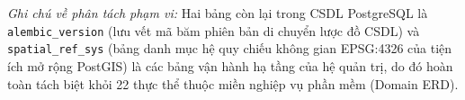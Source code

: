 \noindent\textit{Ghi chú về phân tách phạm vi:} Hai bảng còn lại trong CSDL PostgreSQL là \texttt{alembic\_version} (lưu vết mã băm phiên bản di chuyển lược đồ CSDL) và \texttt{spatial\_ref\_sys} (bảng danh mục hệ quy chiếu không gian EPSG:4326 của tiện ích mở rộng PostGIS) là các bảng vận hành hạ tầng của hệ quản trị, do đó hoàn toàn tách biệt khỏi 22 thực thể thuộc miền nghiệp vụ phần mềm (Domain ERD).
